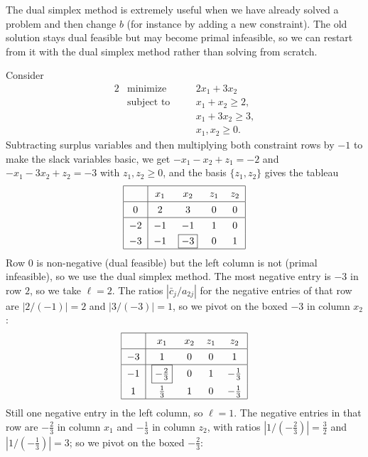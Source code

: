 \documentclass[a4paper]{scrartcl}
\begin{document}
The dual simplex method is extremely useful when we have already solved a problem and then change $b$ (for instance by adding a new constraint). The old solution stays dual feasible but may become primal infeasible, so we can restart from it with the dual simplex method rather than solving from scratch.

\begin{example}
    Consider
    \begin{alignat*}{2}
        & \text{minimize} \quad && 2x_1 + 3x_2 \\
        & \text{subject to} \quad && x_1 + x_2 \geq 2, \\
        & && x_1 + 3x_2 \geq 3, \\
        & && x_1, x_2 \geq 0.
    \end{alignat*}
    Subtracting surplus variables and then multiplying both constraint rows by $-1$ to make the slack variables basic, we get $-x_1 - x_2 + z_1 = -2$ and $-x_1 - 3x_2 + z_2 = -3$ with $z_1, z_2 \geq 0$, and the basis $\{z_1, z_2\}$ gives the tableau
    $$
    \arraycolsep=6pt\def\arraystretch{1.3}
    \begin{array}{|c|cccc|}\hline
        \multicolumn{1}{|c|}{} & x_1 & x_2 & z_1 & z_2\\\hline
        0 & 2 & 3 & 0 & 0\\\hline
        -2 & -1 & -1 & 1 & 0\\
        -3 & -1 & \boxed{-3} & 0 & 1\\\hline
    \end{array}
    $$
    Row $0$ is non-negative (dual feasible) but the left column is not (primal infeasible), so we use the dual simplex method. The most negative entry is $-3$ in row $2$, so we take $\ell = 2$. The ratios $|\bar c_j/a_{2j}|$ for the negative entries of that row are $|2/(-1)| = 2$ and $|3/(-3)| = 1$, so we pivot on the boxed $-3$ in column $x_2$:
    $$
    \arraycolsep=6pt\def\arraystretch{1.3}
    \begin{array}{|c|cccc|}\hline
        \multicolumn{1}{|c|}{} & x_1 & x_2 & z_1 & z_2\\\hline
        -3 & 1 & 0 & 0 & 1\\\hline
        -1 & \boxed{-\tfrac23} & 0 & 1 & -\frac13\\
        1 & \frac13 & 1 & 0 & -\frac13\\\hline
    \end{array}
    $$
    Still one negative entry in the left column, so $\ell = 1$. The negative entries in that row are $-\frac23$ in column $x_1$ and $-\frac13$ in column $z_2$, with ratios $|1/(-\frac23)| = \frac32$ and $|1/(-\frac13)| = 3$; so we pivot on the boxed $-\frac23$:

\end{example}
\end{document}
